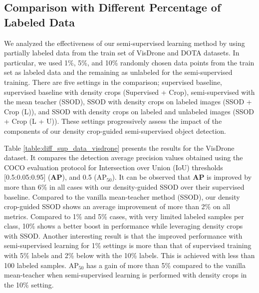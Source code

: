 \subsection{Comparison with Different Percentage of Labeled Data}
We analyzed the effectiveness of our semi-supervised learning method by using partially labeled data from the train set of VisDrone and DOTA datasets. In particular, we used 1\%, 5\%, and 10\% randomly chosen data points from the train set as labeled data and the remaining as unlabeled for the semi-supervised training. There are five settings in the comparison; supervised baseline, supervised baseline with density crops (Supervised + Crop), semi-supervised with the mean teacher (SSOD), SSOD with density crops on labeled images (SSOD + Crop (L)), and SSOD with density crops on labeled and unlabeled images (SSOD + Crop (L + U)). These settings progressively assess the impact of the components of our density crop-guided semi-supervised object detection.

Table \ref{table:diff_sup_data_visdrone} presents the results for the VisDrone\cite{zhu-VisDrone-2018} dataset.  It compares the detection average precision values obtained using the COCO evaluation protocol \cite{mscoco-Lin-2014} for Intersection over Union (IoU) thresholds [0.5:0.05:0.95] (\textbf{AP}), and 0.5 (\textbf{$\textrm{AP}_{50}$}). It can be observed that \textbf{AP} is improved by more than 6\% in all cases with our density-guided SSOD over their supervised baseline. Compared to the vanilla mean-teacher method (SSOD), our density crop-guided SSOD shows an average improvement of more than 2\% on all metrics. Compared to 1\% and 5\% cases, with very limited labeled samples per class, 10\% shows a better boost in performance while leveraging density crops with SSOD. Another interesting result is that the improved performance with semi-supervised learning for 1\% settings is more than that of supervised training with 5\% labels and 2\% below with the 10\% labels. This is achieved with less than 100 labeled samples. $\textrm{AP}_{50}$ has a gain of more than 5\% compared to the vanilla mean-teacher when semi-supervised learning is performed with density crops in the 10\% setting.  

